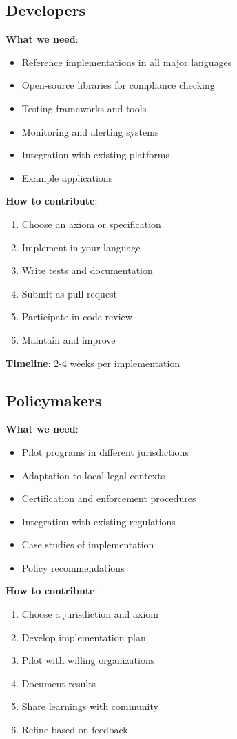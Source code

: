 \documentclass[12pt,a4paper,twoside,openright]{book}
\begin{document}
\subsection{Developers}

\textbf{What we need}:
\begin{itemize}
    \item Reference implementations in all major languages
    \item Open-source libraries for compliance checking
    \item Testing frameworks and tools
    \item Monitoring and alerting systems
    \item Integration with existing platforms
    \item Example applications
\end{itemize}

\textbf{How to contribute}:
\begin{enumerate}
    \item Choose an axiom or specification
    \item Implement in your language
    \item Write tests and documentation
    \item Submit as pull request
    \item Participate in code review
    \item Maintain and improve
\end{enumerate}

\textbf{Timeline}: 2-4 weeks per implementation

\subsection{Policymakers}

\textbf{What we need}:
\begin{itemize}
    \item Pilot programs in different jurisdictions
    \item Adaptation to local legal contexts
    \item Certification and enforcement procedures
    \item Integration with existing regulations
    \item Case studies of implementation
    \item Policy recommendations
\end{itemize}

\textbf{How to contribute}:
\begin{enumerate}
    \item Choose a jurisdiction and axiom
    \item Develop implementation plan
    \item Pilot with willing organizations
    \item Document results
    \item Share learnings with community
    \item Refine based on feedback
\end{enumerate}
\end{document}

